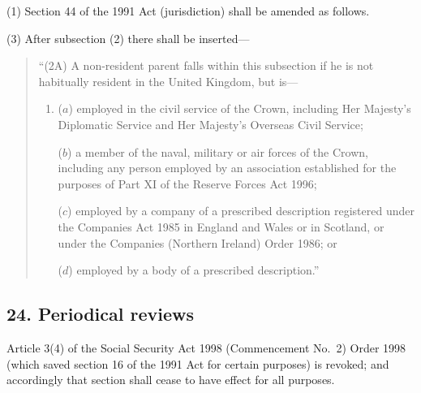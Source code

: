 \documentclass[12pt,a4paper]{article}
\begin{document}
(1) Section 44 of the 1991 Act (jurisdiction) shall be amended as follows.
 

(3) After subsection (2)  there shall be inserted—
\begin{quotation}
“(2A) A non-resident parent falls within this subsection if he is not habitually resident in the United Kingdom, but is—
\begin{enumerate}\item[]
($a$) employed in the civil service of the Crown, including Her Majesty’s Diplomatic Service and Her Majesty’s Overseas Civil Service;

($b$) a member of the naval, military or air forces of the Crown, including any person employed by an association established for the purposes of Part XI of the Reserve Forces Act 1996;

($c$) employed by a company of a prescribed description registered under the Companies Act 1985 in England and Wales or in Scotland, or under the Companies (Northern Ireland) Order 1986; or

($d$) employed by a body of a prescribed description.”
\end{enumerate}
\end{quotation}



%

\subsection{24. Periodical reviews}

Article 3(4)  of the  Social Security Act 1998 (Commencement No.\ 2) Order 1998 (which saved section 16 of the 1991 Act for certain purposes) is revoked; and accordingly that section shall cease to have effect for all purposes.
\end{document}
